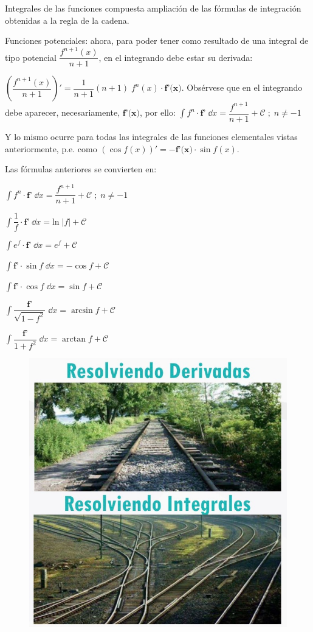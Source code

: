 \begin{teor} Integrales de las funciones compuesta ampliación de las fórmulas de integración obtenidas a la regla de la cadena.
	
	Funciones potenciales:  ahora, para poder tener como resultado de una integral de tipo potencial $\dfrac {f^{n+1} (x)}{n+1}$, en el integrando debe estar su derivada: 
	
	$\left( \dfrac {f^{n+1} (x)}{n+1} \right)' = \dfrac {1}{n+1} (n+1)\;  f^n (x)\cdot \textbf{f'(x)}$. Obsérvese que en el integrando debe aparecer, necesariamente, $\textbf{f'(x)}$, por ello: $   \int f^n \cdot \textbf{f'} \; \dd x = \dfrac {f^{n+1}}{n+1} + \mathcal C \; ; \; n\neq -1  $
		
		Y lo mismo ocurre para todas las integrales de las funciones elementales vistas anteriormente, p.e. como $(\cos f(x))'=- \textbf{f'(x)} \cdot \sin f(x)$.
		
		Las fórmulas anteriores se convierten en:
	
	\begin{multicols}{2}
			
	 $ \boxed{ \displaystyle \int f^n \cdot \textbf{f'} \; \dd x = \dfrac {f^{n+1}}{n+1} + \mathcal C \; ; \; n\neq -1 } $
	
	 $ \boxed{ \displaystyle  \int \dfrac 1 f \cdot \textbf{f'} \; \dd x = \mathrm{ln} \;  |f| + \mathcal {C} }$
	
	  $ \boxed{ \displaystyle \int e^f \cdot \textbf{f'} \; \dd x = e^f + \mathcal C } $
	
	 $ \boxed{ \displaystyle \int \textbf{f'} \cdot \sin f \; \dd x=  - \cos f + \mathcal C } $ 
	
	 $ \boxed{ \displaystyle \int \textbf{f'} \cdot \cos f \; \dd x=  \sin f + \mathcal C }  $
	

	  $ \boxed{ \displaystyle  \int \dfrac {\textbf{f'}} {\sqrt{1-f^2}} \; \dd x = \arcsin f + \mathcal C } $

	 $\boxed{ \displaystyle  \int \dfrac {\textbf{f'}}{1+f^2} \; \dd x = \arctan f + \mathcal C } $
	 
	 \end{multicols}

	 
	 \begin{figure}[H]
		\centering
		\includegraphics[width=0.5
		\textwidth]{imagenes/imagenes07/xiste07.png}
	\end{figure}

	
	
\end{teor}

